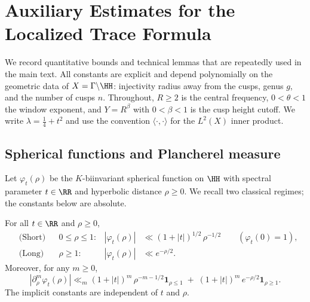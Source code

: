 
\section{Auxiliary Estimates for the Localized Trace Formula}
\label{app:aux}

We record quantitative bounds and technical lemmas that are repeatedly
used in the main text. All constants are explicit and depend
polynomially on the geometric data of $X=\Gamma\backslash\HH$:
injectivity radius away from the cusps, genus $g$, and the number of cusps $n$.
Throughout, $R\ge 2$ is the central frequency, $0<\theta<1$ the window exponent,
and $Y=R^\beta$ with $0<\beta<1$ is the cusp height cutoff. We write
$\lambda=\tfrac14+t^2$ and use the convention $\langle \cdot,\cdot\rangle$
for the $L^2(X)$ inner product.

\subsection{Spherical functions and Plancherel measure}
\label{app:aux:spherical}

Let $\varphi_t(\rho)$ be the $K$-biinvariant spherical function on $\HH$
with spectral parameter $t\in\RR$ and hyperbolic distance $\rho\ge 0$.
We recall two classical regimes; the constants below are absolute.

\begin{lemma}
\label{lem:sf-bounds}
For all $t\in\RR$ and $\rho\ge 0$,
\begin{align}
&\text{(Short)} && 0\le \rho\le 1: &
|\varphi_t(\rho)| &\ll (1+|t|)^{1/2}\,\rho^{-1/2}
\qquad(\varphi_t(0)=1), \label{eq:sf-short}\\
&\text{(Long)} && \rho\ge 1: &
|\varphi_t(\rho)| &\ll e^{-\rho/2}. \label{eq:sf-long}
\end{align}
Moreover, for any $m\ge 0$,
\begin{equation}\label{eq:sf-deriv}
|\partial_\rho^m \varphi_t(\rho)|
\ll_m (1+|t|)^m\,\rho^{-m-1/2}\mathbf{1}_{\rho\le 1}
\;+\; (1+|t|)^m\,e^{-\rho/2}\mathbf{1}_{\rho\ge 1}.
\end{equation}
The implicit constants are independent of $t$ and $\rho$.
\end{lemma}

